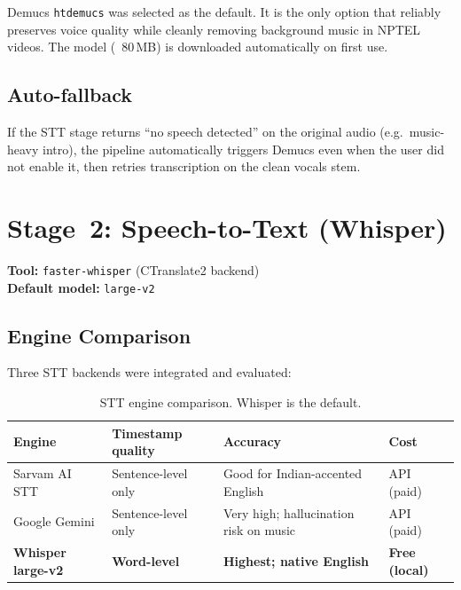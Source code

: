 \documentclass[12pt,a4paper]{article}
\begin{document}
Demucs \texttt{htdemucs} was selected as the default. It is the only option
that reliably preserves voice quality while cleanly removing background music
in NPTEL videos.  The model (~80\,MB) is downloaded automatically on first
use.

\subsection{Auto-fallback}

If the STT stage returns ``no speech detected'' on the original audio (e.g.\
music-heavy intro), the pipeline automatically triggers Demucs even when the
user did not enable it, then retries transcription on the clean vocals stem.

\section{Stage~2: Speech-to-Text (Whisper)}

\textbf{Tool:} \texttt{faster-whisper} (CTranslate2 backend)\\
\textbf{Default model:} \texttt{large-v2}

\subsection{Engine Comparison}

Three STT backends were integrated and evaluated:

\begin{table}[H]
\centering
\begin{tabularx}{\linewidth}{lXXX}
\toprule
\textbf{Engine} & \textbf{Timestamp quality} & \textbf{Accuracy} & \textbf{Cost} \\
\midrule
Sarvam AI STT   & Sentence-level only        & Good for Indian-accented English & API (paid) \\
Google Gemini   & Sentence-level only        & Very high; hallucination risk on music & API (paid) \\
\textbf{Whisper large-v2} & \textbf{Word-level} & \textbf{Highest; native English} & \textbf{Free (local)} \\
\bottomrule
\end{tabularx}
\caption{STT engine comparison.  Whisper is the default.}
\end{table}
\end{document}
